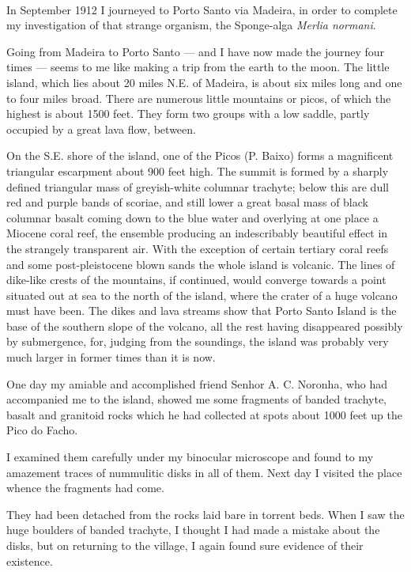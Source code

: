 \documentclass[a4paper, 12pt, oneside]{article}
\begin{document}
\paragraph{}
In September 1912 I journeyed to Porto Santo via Madeira, in order to complete my investigation of that strange organism, the Sponge-alga \emph{Merlia normani}.

Going from Madeira to Porto Santo --- and I have now made the journey four times --- seems to me like making a trip from the earth to the moon. The little island, which lies about 20 miles N.E. of Madeira, is about six miles long and one to four miles broad. There are numerous little mountains or picos, of which the highest is about 1500 feet. They form two groups with a low saddle, partly occupied by a great lava flow, between.

On the S.E. shore of the island, one of the Picos (P. Baixo) forms a magnificent triangular escarpment about 900 feet high. The summit is formed by a sharply defined triangular mass of greyish-white columnar trachyte; below this are dull red and purple bands of scoriae, and still lower a great basal mass of black columnar basalt coming down to the blue water and overlying at one place a Miocene coral reef, the ensemble producing an indescribably beautiful effect in the strangely transparent air. With the exception of certain tertiary coral reefs and some post-pleistocene blown sands the whole island is volcanic. The lines of dike-like crests of the mountains, if continued, would converge towards a point situated out at sea to the north of the island, where the crater of a huge volcano must have been. The dikes and lava streams show that Porto Santo Island is the base of the southern slope of the volcano, all the rest having disappeared possibly by submergence, for, judging from the soundings, the island was probably very much larger in former times than it is now.

One day my amiable and accomplished friend Senhor A. C. Noronha, who had accompanied me to the island, showed me some fragments of banded trachyte, basalt and granitoid rocks which he had collected at spots about 1000 feet up the Pico do Facho.

I examined them carefully under my binocular microscope and found to my amazement traces of nummulitic disks in all of them. Next day I visited the place whence the fragments had come.

They had been detached from the rocks laid bare in torrent beds. When I saw the huge boulders of banded trachyte, I thought I had made a mistake about the disks, but on returning to the village, I again found sure evidence of their existence.
\end{document}
